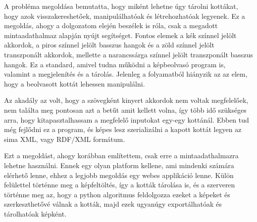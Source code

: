 
A probléma megoldása bemutatta, hogy miként lehetne úgy tárolni kottákat, hogy azok visszakereshetőek, manipulálhatóak és létrehozhatóak legyenek. Ez a megoldás, ahogy a dolgozatom elején beszélek is róla, csak a megadott mintaadathalmaz alapján nyújt segítséget. Fontos elemek a kék színnel jelölt akkordok, a piros színnel jelölt basszus hangok és a zöld színnel jelölt transzponált akkordok, mellette a narancssárga színnel jelölt transzponált basszus hangok. Ez a standard, amivel tudna működni a képbeolvasó program is, valamint a megjelenítés és a tárolás. Jelenleg a folyamatból hiányzik az az elem, hogy a beolvasott kottát lehessen manipulálni.

Az akadály az volt, hogy a szövegként kinyert akkordok nem voltak megfelelőek, nem találta meg pontosan azt a betűt amit kellett volna, így több idő szükséges arra, hogy kitapasztalhassam a megfelelő inputokat egy-egy kottánál. Ebben tud még fejlődni ez a program, és képes lesz szerializálni a kapott kottát legyen az sima XML, vagy RDF/XML formátum.

Ezt a megoldást, ahogy korábban említettem, csak erre a mintaadathalmazra lehetne használni. Ennek egy olyan platform kellene, ami mindenki számára elérhető lenne, ehhez a legjobb megoldás egy webes applikáció lenne. Külön felülettel történne meg a képfeltöltés, így a kották tárolása is, és a szerveren történne meg az, hogy a python algoritmus feldolgozza ezeket a képeket és szerkeszthetővé válnak a kották, majd ezek ugyanúgy exportálhatóak és tárolhatóak képként.

